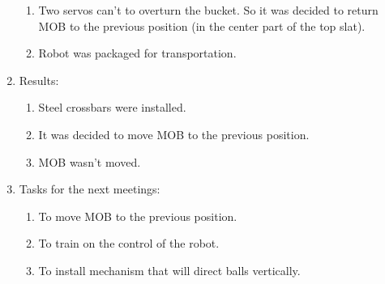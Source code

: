 \begin{enumerate}
\begin{enumerate}
		\item Two servos can't to overturn the bucket. So it was decided to return MOB to the previous position (in the center part of the top slat).
		
		\item Robot was packaged for transportation.
		
	\end{enumerate}
	\item Results: 
	\begin{enumerate}
		\item Steel crossbars were installed.
		
		\item It was decided to move MOB to the previous position.
		
		\item MOB wasn't moved.
		
	\end{enumerate}
	\item Tasks for the next meetings:
	\begin{enumerate}	
		\item To move MOB to the previous position.
		
		\item To train on the control of the robot.
		
		\item To install mechanism that will direct balls vertically.
		
	\end{enumerate}
\end{enumerate}
\fillpage